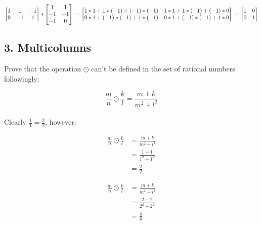 \documentclass[12pt, oneside]{article}
\begin{document}
$\begin{bmatrix}
1 & 1 & -1 \\
0 & -1 & 1 \\
 \end{bmatrix}
 *
 \begin{bmatrix}
1 & 1 \\
-1 & -1 \\
-1 & 0
 \end{bmatrix} \\ \\ \\
 =
  \begin{bmatrix}
  1*1 + 1*(-1) + (-1)*(-1) & 1*1 + 1*(-1) + (-1) * 0\\
  0*1 + (-1)*(-1) + 1*(-1) &  0*1 + (-1)*(-1) + 1*0\\
 \end{bmatrix} \\ \\ \\
 =
 \begin{bmatrix}
  1 & 0  \\
  0 & 1
 \end{bmatrix}$\\

\pagebreak

\subsection*{3. Multicolumns} 

Prove that the operation $\odot$ can't be defined in the set of rational numbers followingly:

$$\frac{m}{n} \odot \frac{k}{l} = \frac{m+k}{m^2+l^2}$$\\

\noindent Clearly  $\frac{1}{1} = \frac{2}{2}$, however:

\begin{multicols}{2}
\begin{align*}
\frac {m} {n} \odot \frac {k} {l} & = \frac{m+k}{m^2+l^2}\\
& = \frac{1+1}{1^2+1^2} \\
& = \frac{2}{2} 
\end{align*}

\columnbreak

\begin{align*}
\frac {m} {n} \odot \frac {k} {l} & = \frac{m+k}{m^2+l^2}\\
& = \frac{2+2}{2^2+2^2} \\
& = \frac{4}{8}
\end{align*}
\end{multicols}
\end{document}
